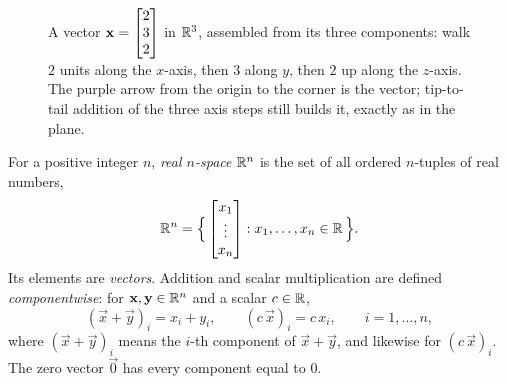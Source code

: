 \begin{figure}[H]
\centering
{}
\caption{A vector $\vec{x}=\colvec{2\\3\\2}$ in $\R^3$, assembled from its three
components: walk $2$ units along the $x$-axis, then $3$ along $y$, then $2$ up along the $z$-axis. The
purple arrow from the origin to the corner is the vector; tip-to-tail addition of the
three axis steps still builds it, exactly as in the plane.}
\label{ch02:fig-r3}
\end{figure}

\begin{formalbox}
\begin{definition}
\label{ch02:def-rn}
For a positive integer $n$, \emph{real $n$-space} $\R^n$ is the set of all ordered
$n$-tuples of real numbers,
\[
  \R^n = \set[\Big]{\, \colvec{x_1\\ \vdots \\ x_n} : x_1,\dots,x_n \in \R \,}.
\]
Its elements are \emph{vectors}. Addition and scalar multiplication are defined
\emph{componentwise}: for $\vec{x},\vec{y}\in\R^n$ and a scalar $c\in\R$,
\[
  (\vec{x}+\vec{y})_i = x_i + y_i,
  \qquad
  (c\,\vec{x})_i = c\,x_i,
  \qquad i = 1,\dots,n,
\]
where $(\vec{x}+\vec{y})_i$ means the $i$-th component of $\vec{x}+\vec{y}$, and
likewise for $(c\,\vec{x})_i$. The zero vector $\vec{0}$ has every component equal to $0$.
\end{definition}
\end{formalbox}

